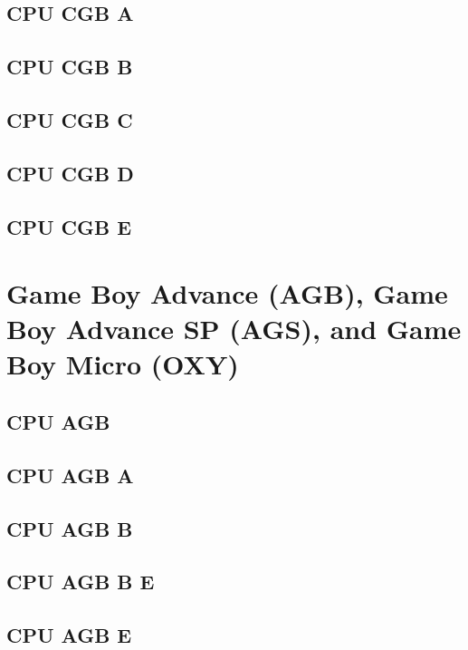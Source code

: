\subsection{CPU CGB A}

\subsection{CPU CGB B}

\subsection{CPU CGB C}

\subsection{CPU CGB D}

\subsection{CPU CGB E}

\section{Game Boy Advance (AGB), Game Boy Advance SP (AGS), and Game Boy Micro (OXY)}

\subsection{CPU AGB}

\subsection{CPU AGB A}

\subsection{CPU AGB B}

\subsection{CPU AGB B E}

\subsection{CPU AGB E}
